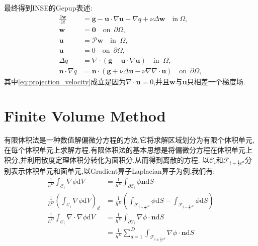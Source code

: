 \documentclass[12pt,halfline,a4paper]{ouparticle}
\begin{document}
最终得到INSE的Gepup表述:
\begin{align}
    {\frac{\partial\boldsymbol{w}} {\partial t}}&=\boldsymbol{g}-\boldsymbol{u} \cdot\nabla\boldsymbol{u}-\nabla q+\nu\Delta\boldsymbol{w} \quad{\mathrm{i n}} \ \Omega, \\
    \boldsymbol{w}&=\boldsymbol{0} \quad\mathrm{o n} \, \, \, \partial\Omega, \\
    \boldsymbol{u}&=\mathscr{P} \boldsymbol{w} \quad\mathrm{i n} \; \; \Omega,\label{eq:projection_velocity} \\
    \boldsymbol{u}&=0 \quad\mathrm{o n} \, \, \, \partial\Omega, \\
    \Delta q&=\nabla\cdot( \boldsymbol{g}-\boldsymbol{u} \cdot\nabla\boldsymbol{u} ) \quad\mathrm{i n} \; \; \Omega, \\
    \boldsymbol{n} \cdot\nabla q&=\boldsymbol{n} \cdot( \boldsymbol{g}+\nu\Delta\boldsymbol{u}-\nu\nabla\nabla\cdot\boldsymbol{u} ) \quad{\mathrm{o n}} \, \, \, \partial\Omega, 
\end{align}
其中\eqref{eq:projection_velocity}成立是因为$\nabla \cdot \boldsymbol{u} = 0$,并且$\boldsymbol{w}$与$\boldsymbol{u}$只相差一个梯度场.



\section{Finite Volume Method}
有限体积法是一种数值解偏微分方程的方法,它将求解区域划分为有限个体积单元,在每个体积单元上求解方程.有限体积法的基本思想是将偏微分方程在体积单元上积分,并利用散度定理体积分转化为面积分,从而得到离散的方程.
以$\mathcal{C}_i$和$\mathcal{F}_{i+\frac12 e^d}$分别表示体积单元和面单元,以Gradient算子Laplacian算子为例,我们有:
\begin{equation}
    \begin{aligned}
        \frac{1}{h^D}\int_{\mathcal{C}_i} \nabla \phi \text{d} V 
        &= \frac{1}{h^D}\int_{\partial \mathcal{C}_i} \phi\mathbf{n} \text{d} S \\
        \frac{1}{h^D}(\int_{\mathcal{C}_i} \nabla \phi \text{d} V )_d
        &= \frac{1}{h^D}(\int_{\mathcal{F}_{i+ \frac12 e^d}} \phi \text{d} S - \int_{\mathcal{F}_{i- \frac12 e^d}} \phi \text{d} S)\\
        \frac{1}{h^D}\int_{\mathcal{C}_i} \nabla \cdot \nabla \phi \text{d} V 
        &= \frac{1}{h^D}\int_{\partial \mathcal{C}_i} \nabla \phi \cdot \mathbf{n} \text{d} S \\
        &= \frac{1}{h^D}\sum_{d=1}^D \int_{\mathcal{F}_{i\pm \frac12 e^d}} \nabla \phi \cdot \mathbf{n} \text{d} S
    \end{aligned}
\end{equation}
\end{document}
